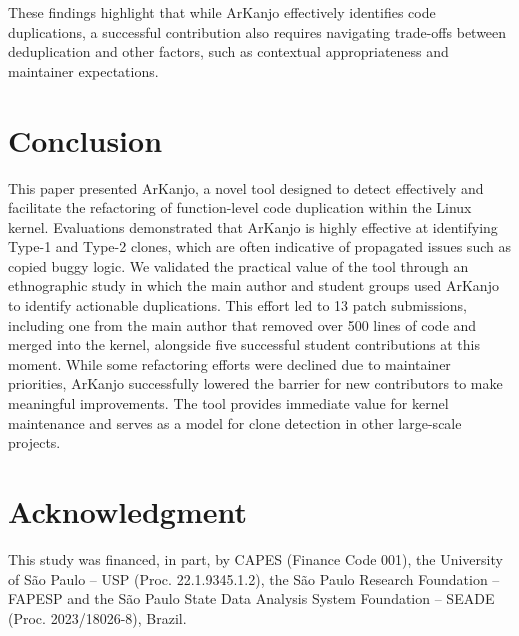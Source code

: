 \documentclass[conference]{IEEEtran}
\begin{document}
These findings highlight that while ArKanjo effectively identifies code duplications, a successful 
contribution also requires navigating trade-offs between deduplication and other factors, such as 
contextual appropriateness and maintainer expectations.


\section{Conclusion}

This paper presented ArKanjo, a novel tool designed to detect effectively 
and facilitate the refactoring of function-level code duplication within the Linux kernel. 
Evaluations demonstrated that ArKanjo is highly effective at identifying Type-1 and Type-2 
clones, which are often indicative of propagated issues such as copied buggy logic. We validated the practical 
value of the tool through an ethnographic study in which the main author and student 
groups used ArKanjo to identify actionable duplications. This effort led to 13 patch 
submissions, including one from the main author that removed over 500 lines of code and merged 
into the kernel, alongside five successful student contributions at this moment. While some refactoring 
efforts were declined due to maintainer priorities, ArKanjo successfully lowered the barrier 
for new contributors to make meaningful improvements. The tool provides immediate value for 
kernel maintenance and serves as a model for clone detection in other large-scale projects.

\section*{Acknowledgment}

This study was financed, in part, by CAPES (Finance Code 001), the University of São Paulo – USP (Proc. 22.1.9345.1.2), the São Paulo Research Foundation – FAPESP and the São Paulo State Data Analysis System Foundation – SEADE (Proc. 2023/18026-8), Brazil.



\end{document}
